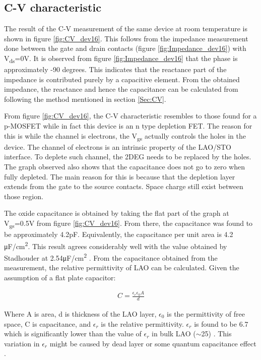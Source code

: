 \documentclass[11pt,a4paper]{report}
\begin{document}
\newpage


\subsection{C-V characteristic}
The result of the C-V measurement of the same device at room temperature is shown in figure \ref{fig:CV_dev16}. This follows from the impedance measurement done between the gate and drain contacts (figure \ref{fig:Impedance_dev16}) with V\textsubscript{ds}=0V. It is observed from figure \ref{fig:Impedance_dev16} that the phase is approximately -90 degrees. This indicates that the reactance part of the impedance is contributed purely by a capacitive element. From the obtained impedance, the reactance and hence the capacitance can be calculated from following the method mentioned in section \ref{Sec:CV}. 

From figure \ref{fig:CV_dev16}, the C-V characteristic resembles to those found for a p-MOSFET while in fact this device is an n type depletion FET. The reason for this is while the channel is electrons, the V\textsubscript{gs} actually controls the holes in the device. The channel of electrons is an intrinsic property of the LAO/STO interface. To deplete such channel, the 2DEG needs to be replaced by the holes. The graph observed also shows that the capacitance does not go to zero when fully depleted. The main reason for this is because that the depletion layer extends from the gate to the source contacts. Space charge still exist between those region.

The oxide capacitance is obtained by taking the flat part of the graph at V\textsubscript{gs}=0.5V from figure \ref{fig:CV_dev16}. From there, the capacitance was found to be approximately 4.2\si{pF}. Equivalently, the capacitance per unit area is 4.2 \si{\micro F/cm^2}. This result agrees considerably well with the value obtained by Stadhouder at 2.54\si{\micro F/cm^2} \cite{stadhouder_2018}. From the capacitance obtained from the measurement, the relative permittivity of LAO can be calculated. Given the assumption of a flat plate capacitor:

\begin{align}
    C = \frac{\epsilon_r \epsilon_0 A}{d}
\end{align}

Where A is area, d is thickness of the LAO layer, $\epsilon_0$ is the permittivity of free space, C is capacitance, and $\epsilon_r$ is the relative permittivity. $\epsilon_r$ is found to be 6.7 which is significantly lower than the value of $\epsilon_r$ in bulk LAO ($\sim$25) \cite{ohtomo_hwang_2004}. This variation in $\epsilon_r$ might be caused by dead layer \cite{hosoda_hikita_hwang_bell_2013} or some quantum capacitance effect \cite{li_Large_capacitance_enhancement_2011}.
\end{document}
